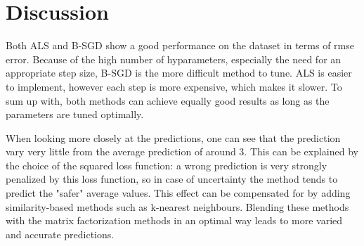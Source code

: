 \section{Discussion}

Both ALS and B-SGD show a good performance on the dataset in terms of rmse
error. Because of the high number of hyparameters, especially the need for an
appropriate step size, B-SGD is the more difficult method to tune. ALS is easier
to implement, however each step is more expensive, which makes it slower. To sum
up with, both methods can achieve equally good results as long as the parameters
are tuned optimally. 

When looking more closely at the predictions, one can see that
the prediction vary very little from the average prediction of around 3. This
can be explained by the choice of the squared loss function: a wrong prediction
is very strongly penalized by this loss function, so in case of uncertainty the
method tends to predict the "safer" average values. This effect can be
compensated for by adding similarity-based methods such as k-nearest neighbours.
Blending these methods with the matrix factorization methods 
in an optimal way leads to more varied and accurate predictions. 

